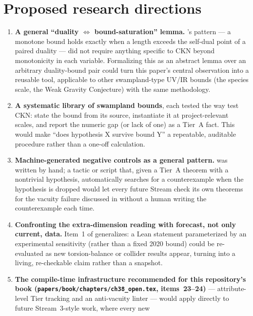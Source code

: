\documentclass[11pt,a4paper]{article}
\theoremstyle{remark}
\begin{document}
\section{Proposed research directions}
\label{sec:directions}
\begin{enumerate}
\item \textbf{A general ``duality $\iff$ bound-saturation'' lemma.} 's pattern ---
a monotone bound holds exactly when a length exceeds the self-dual point of a paired duality ---
did not require anything specific to CKN beyond monotonicity in each variable. Formalizing this
as an abstract lemma over an arbitrary duality-bound pair could turn this paper's central
observation into a reusable tool, applicable to other swampland-type UV/IR bounds (the species
scale, the Weak Gravity Conjecture) with the same methodology.
\item \textbf{A systematic library of swampland bounds}, each tested the way 
test CKN: state the bound from its source, instantiate it at project-relevant scales, and report
the numeric gap (or lack of one) as a Tier~A fact. This would make ``does hypothesis X survive
bound Y'' a repeatable, auditable procedure rather than a one-off calculation.
\item \textbf{Machine-generated negative controls as a general pattern.}  was
written by hand; a tactic or script that, given a Tier~A theorem with a nontrivial hypothesis,
automatically searches for a counterexample when the hypothesis is dropped would let every future
Stream check its own theorems for the vacuity failure discussed in  without a
human writing the counterexample each time.
\item \textbf{Confronting the extra-dimension reading with forecast, not only current, data.}
Item~1 of  generalizes: a Lean statement parameterized by an experimental
sensitivity (rather than a fixed 2020 bound) could be re-evaluated as new torsion-balance or
collider results appear, turning  into a living, re-checkable claim rather than a
snapshot.
\item \textbf{The compile-time infrastructure recommended for this repository's book
(\texttt{papers/book/chapters/ch38\_open.tex}, items~23--24)} --- attribute-level Tier tracking
and an anti-vacuity linter --- would apply directly to future Stream~3-style work, where every new

\end{enumerate}
\end{document}
